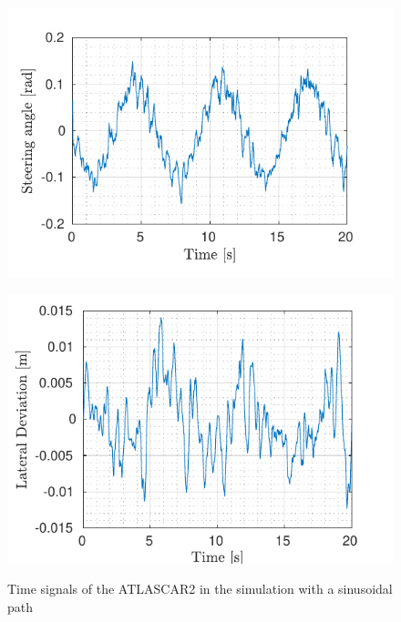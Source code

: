 \documentclass[conference,11pt]{IEEEtran}
\begin{document}
\begin{figure}[!t]
\begin{minipage}[t]{\columnwidth}
	\includegraphics[width=\columnwidth]{../../MATLAB/lane_following/figure/SteeringAngleVsTime.pdf}
	\label{fig:steering_laneFollowing}
\end{minipage}
\begin{minipage}[t]{\columnwidth}
	\includegraphics[width=\columnwidth]{../../MATLAB/lane_following/figure/LateralDeviationVsTime.pdf}
	\label{fig:lateral_deviation_laneFollowing}
\end{minipage}
\caption{Time signals of the ATLASCAR2 in the simulation with a sinusoidal path}
\label{fig:laneFollowing_signals}
\end{figure}
\end{document}
